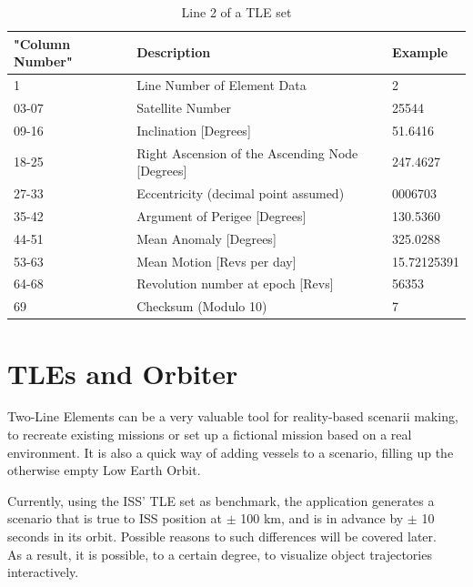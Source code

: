 \documentclass[a4paper]{article}
\begin{document}
		\begin{table}[h!]
			\centering
			\caption{Line 2 of a TLE set}
			\begin{tabular}{lll}
				\textbf{"Column Number"} & \textbf{Description}                                & \textbf{Example} \\ \midrule
				1                        & Line Number of Element Data                         & 2                \\ \midrule
				03-07                    & Satellite Number                                    & 25544            \\ \midrule
				09-16                    & Inclination {[}Degrees{]}                           & 51.6416          \\ \midrule
				18-25                    & Right Ascension of the Ascending Node {[}Degrees{]} & 247.4627         \\ \midrule
				27-33                    & Eccentricity (decimal point assumed)                & 0006703          \\ \midrule
				35-42                    & Argument of Perigee {[}Degrees{]}                   & 130.5360         \\ \midrule
				44-51                    & Mean Anomaly {[}Degrees{]}                          & 325.0288         \\ \midrule
				53-63                    & Mean Motion {[}Revs per day{]}                      & 15.72125391      \\ \midrule
				64-68                    & Revolution number at epoch {[}Revs{]}               & 56353            \\ \midrule
				69                       & Checksum (Modulo 10)                                & 7                \\ \bottomrule
			\end{tabular}
		\end{table}
		\newpage
		\section{TLEs and Orbiter}
		Two-Line Elements can be a very valuable tool for reality-based scenarii making, to recreate existing missions or set up a fictional mission based on a real environment. It is also a quick way of adding vessels to a scenario, filling up the otherwise empty Low Earth Orbit.
		
		Currently, using the ISS' TLE set as benchmark, the application generates a scenario that is true to ISS position at $\pm$ 100 km, and is in advance by $\pm$ 10 seconds in its orbit. Possible reasons to such differences will be covered later.\\
		As a result, it is possible, to a certain degree, to visualize object trajectories interactively.
		
\end{document}
